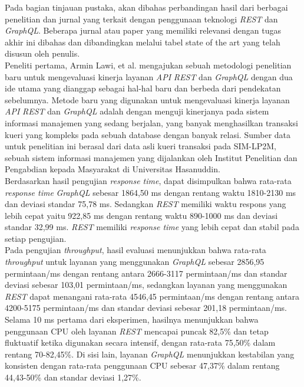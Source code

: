 Pada bagian tinjauan pustaka, akan dibahas perbandingan hasil dari berbagai penelitian dan jurnal yang terkait dengan penggunaan teknologi \textit{REST} dan \textit{GraphQL}. Beberapa jurnal atau paper yang memiliki relevansi dengan tugas akhir ini dibahas dan dibandingkan melalui tabel state of the art yang telah disusun oleh penulis.\\

Peneliti pertama, Armin Lawi, et al. \cite{2} mengajukan sebuah metodologi penelitian baru untuk mengevaluasi kinerja layanan \textit{API} \textit{REST} dan \textit{GraphQL} dengan dua ide utama yang dianggap sebagai hal-hal baru dan berbeda dari pendekatan sebelumnya. Metode baru yang digunakan untuk mengevaluasi kinerja layanan \textit{API} \textit{REST} dan \textit{GraphQL} adalah dengan menguji kinerjanya pada sistem informasi manajemen yang sedang berjalan, yang banyak menghasilkan transaksi kueri yang kompleks pada sebuah database dengan banyak relasi. Sumber data untuk penelitian ini berasal dari data asli kueri transaksi pada SIM-LP2M, sebuah sistem informasi manajemen yang dijalankan oleh Institut Penelitian dan Pengabdian kepada Masyarakat di Universitas Hasanuddin.\\

Berdasarkan hasil pengujian \textit{response time}, dapat disimpulkan bahwa rata-rata \textit{response time} \textit{GraphQL} sebesar 1864,50 ms dengan rentang waktu 1810-2130 ms dan deviasi standar 75,78 ms. Sedangkan \textit{REST} memiliki waktu respons yang lebih cepat yaitu 922,85 ms dengan rentang waktu 890-1000 ms dan deviasi standar 32,99 ms. \textit{REST} memiliki \textit{response time} yang lebih cepat dan stabil pada setiap pengujian.\\

Pada pengujian \textit{throughput}, hasil evaluasi menunjukkan bahwa rata-rata \textit{throughput} untuk layanan yang menggunakan \textit{GraphQL} sebesar 2856,95 permintaan/ms dengan rentang antara 2666-3117 permintaan/ms dan standar deviasi sebesar 103,01 permintaan/ms, sedangkan layanan yang menggunakan \textit{REST} dapat menangani rata-rata 4546,45 permintaan/ms dengan rentang antara 4200-5175 permintaan/ms dan standar deviasi sebesar 201,18 permintaan/ms. \\

Selama 10 ms pertama dari eksperimen, hasilnya menunjukkan bahwa penggunaan CPU oleh layanan \textit{REST} mencapai puncak 82,5\% dan tetap fluktuatif ketika digunakan secara intensif, dengan rata-rata 75,50\% dalam rentang 70-82,45\%. Di sisi lain, layanan \textit{GraphQL} menunjukkan kestabilan yang konsisten dengan rata-rata penggunaan CPU sebesar 47,37\% dalam rentang 44,43-50\% dan standar deviasi 1,27\%.\\

